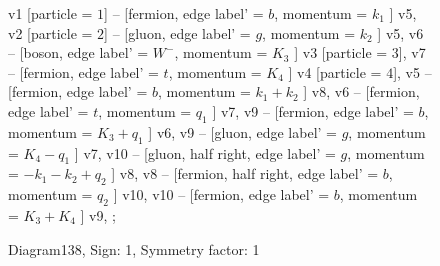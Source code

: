 \documentclass{revtex4}
\begin{document}
\begin{figure}[!htb]
\begin{center}
{    %
v1 [particle = \(1\)] -- [fermion, edge label' = \(b\), momentum = \(k_{1}\) ] v5, 
v2 [particle = \(2\)] -- [gluon, edge label' = \(g\), momentum = \(k_{2}\) ] v5, 
v6 -- [boson, edge label' = \(W^{-}\), momentum = \(K_{3}\) ] v3 [particle = \(3\)], 
v7 -- [fermion, edge label' = \(t\), momentum = \(K_{4}\) ] v4 [particle = \(4\)], 
v5 -- [fermion, edge label' = \(b\), momentum = \(k_{1} + k_{2}\) ] v8, 
v6 -- [fermion, edge label' = \(t\), momentum = \(q_{1}\) ] v7, 
v9 -- [fermion, edge label' = \(b\), momentum = \(K_{3} + q_{1}\) ] v6, 
v9 -- [gluon, edge label' = \(g\), momentum = \(K_{4} - q_{1}\) ] v7, 
v10 -- [gluon, half right, edge label' = \(g\), momentum = \(-k_{1} - k_{2} + q_{2}\) ] v8, 
v8 -- [fermion, half right, edge label' = \(b\), momentum = \(q_{2}\) ] v10, 
v10 -- [fermion, edge label' = \(b\), momentum = \(K_{3} + K_{4}\) ] v9, 
};
\end{center}
\caption{Diagram138, Sign: 1, Symmetry factor: 1}
\end{figure}
\newpage
\end{document}
